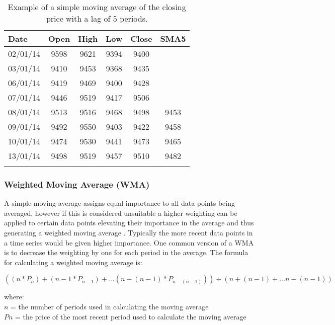 \begin{table}[htbp]
  \centering
  \caption[Example of a Simple Moving Average]{Example of a simple moving average of the closing price with a lag of 5 periods.}
    \begin{tabular}{@{\extracolsep{5pt}}lccccc}
    \toprule
    \textbf{Date} & \textbf{Open} & \textbf{High} & \textbf{Low} & \textbf{Close} & \textbf{SMA5} \\
    \midrule
    02/01/14 & 9598  & 9621  & 9394  & 9400  &  \\
    03/01/14 & 9410  & 9453  & 9368  & 9435  &  \\
    06/01/14 & 9419  & 9469  & 9400  & 9428  &  \\
    07/01/14 & 9446  & 9519  & 9417  & 9506  &  \\
    08/01/14 & 9513  & 9516  & 9468  & 9498  & 9453 \\
    09/01/14 & 9492  & 9550  & 9403  & 9422  & 9458 \\
    10/01/14 & 9474  & 9530  & 9441  & 9473  & 9465 \\
    13/01/14 & 9498  & 9519  & 9457  & 9510  & 9482 \\
    \bottomrule
    \normalsize 
    \end{tabular}%
  \label{tab:SMA}%
\end{table}%

\subsubsection{Weighted Moving Average (WMA)}
A simple moving average assigns equal importance to all data points being averaged, however if this is considered unsuitable a higher weighting can be applied to certain data points elevating their importance in the average and thus generating a weighted moving average \citep{WMA2}. Typically the more recent data points in a time series would be given higher importance. One common version of a WMA is to decrease the weighting by one for each period in the average. The formula for calculating a weighted moving average is:

\[ ((n*P_{n}) + (n-1*P_{n-1})+ ... (n-(n-1)*P_{n-(n-1)})) \div (n + (n-1) + ... n-(n-1))\]

where: \\
$ n $ = the number of periods used in calculating the moving average \\
$ Pn $ = the price of the most recent period used to calculate the moving average 


